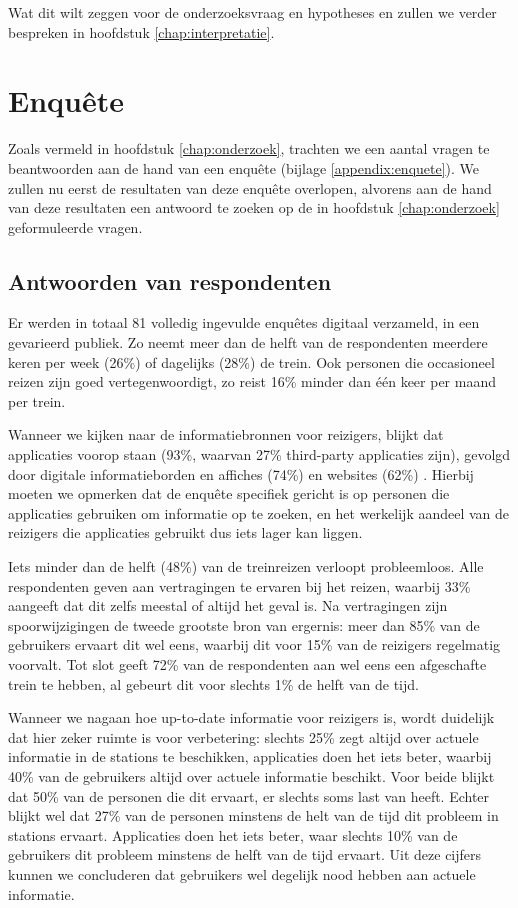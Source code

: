 Wat dit wilt zeggen voor de onderzoeksvraag en hypotheses en zullen we verder bespreken in hoofdstuk \ref{chap:interpretatie}.

\section{Enquête}
Zoals vermeld in hoofdstuk \ref{chap:onderzoek}, trachten we een aantal vragen te beantwoorden aan de hand van een enquête (bijlage \ref{appendix:enquete}). We zullen nu eerst de resultaten van deze enquête overlopen, alvorens aan de hand van deze resultaten een antwoord te zoeken op de in hoofdstuk \ref{chap:onderzoek} geformuleerde vragen.

\subsection{Antwoorden van respondenten}
Er werden in totaal 81 volledig ingevulde enquêtes digitaal verzameld, in een gevarieerd publiek. Zo neemt meer dan de helft van de respondenten meerdere keren per week (26\%) of dagelijks (28\%) de trein. Ook personen die occasioneel reizen zijn goed vertegenwoordigt, zo reist 16\% minder dan één keer per maand per trein.

Wanneer we kijken naar de informatiebronnen voor reizigers, blijkt dat  applicaties voorop staan (93\%, waarvan 27\% third-party applicaties zijn), gevolgd door digitale informatieborden en affiches (74\%) en websites (62\%) . Hierbij moeten we opmerken dat de enquête specifiek gericht is op personen die applicaties gebruiken om informatie op te zoeken, en het werkelijk aandeel van de reizigers die applicaties gebruikt dus iets lager kan liggen.

Iets minder dan de helft (48\%) van de treinreizen verloopt probleemloos. Alle respondenten geven aan vertragingen te ervaren bij het reizen, waarbij 33\% aangeeft dat dit zelfs meestal of altijd het geval is. Na vertragingen zijn spoorwijzigingen de tweede grootste bron van ergernis: meer dan 85\% van de gebruikers ervaart dit wel eens, waarbij dit voor 15\% van de reizigers regelmatig voorvalt. Tot slot geeft 72\% van de respondenten aan wel eens een afgeschafte trein te hebben, al gebeurt dit voor slechts 1\% de helft van de tijd.

Wanneer we nagaan hoe up-to-date informatie voor reizigers is, wordt duidelijk dat hier zeker ruimte is voor verbetering: slechts 25\% zegt altijd over actuele informatie in de stations te beschikken, applicaties doen het iets beter, waarbij 40\% van de gebruikers altijd over actuele informatie beschikt. Voor beide blijkt dat 50\% van de personen die dit ervaart, er slechts soms last van heeft. Echter blijkt wel dat 27\% van de personen minstens de helt van de tijd dit probleem in stations ervaart. Applicaties doen het iets beter, waar slechts 10\% van de gebruikers dit probleem minstens de helft van de tijd ervaart. Uit deze cijfers kunnen we concluderen dat gebruikers wel degelijk nood hebben aan actuele informatie. 

